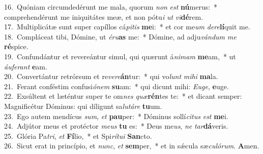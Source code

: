 {16.~}Quóniam circumdedérunt me mala, quorum \textit{non} \textit{est} \textbf{nú}merus:~* comprehendérunt me iniquitátes meæ, et non pótu\textit{i} \textit{ut} \textit{vi}\textbf{dé}rem.\\
{17.~}Multiplicátæ sunt super capíllos cá\textit{pi}\textit{tis} \textbf{me}i:~* et cor me\textit{um} \textit{de}\textit{re}\textbf{lí}quit me.\\
{18.~}Compláceat tibi, Dómine, ut \textit{é}\textit{ru}\textbf{as} me:~* Dómine, ad adju\textit{ván}\textit{dum} \textit{me} \textbf{ré}spice.\\
{19.~}Confundántur et revereántur simul, qui quærunt á\textit{ni}\textit{mam} \textbf{me}am,~* ut \textit{áu}\textit{fe}\textit{rant} \textbf{e}am.\\
{20.~}Convertántur retrórsum et re\textit{ve}\textit{re}\textbf{án}tur:~* qui vo\textit{lunt} \textit{mi}\textit{hi} \textbf{ma}la.\\
{21.~}Ferant conféstim confusi\textit{ó}\textit{nem} \textbf{su}am:~* qui dicunt mihi: \textit{E}\textit{u}\textit{ge}, \textbf{e}uge.\\
{22.~}Exsúltent et læténtur super te om\textit{nes} \textit{quæ}\textbf{rén}tes te:~* et dicant semper: Magnificétur Dóminus: qui díligunt sa\textit{lu}\textit{tá}\textit{re} \textbf{tu}um.\\
{23.~}Ego autem mendícus \textit{sum}, \textit{et} \textbf{pau}per:~* Dóminus sollí\textit{ci}\textit{tus} \textit{est} \textbf{me}i.\\
{24.~}Adjútor meus et protéctor \textit{me}\textit{us} \textbf{tu} es:~* Deus me\textit{us}, \textit{ne} \textit{tar}\textbf{dá}veris.\\
{25.~}Glória Pa\textit{tri}, \textit{et} \textbf{Fí}lio,~* et Spi\textit{rí}\textit{tu}\textit{i} \textbf{San}cto.\\
{26.~}Sicut erat in princípio, et \textit{nunc}, \textit{et} \textbf{sem}per,~* et in sǽcula sæ\textit{cu}\textit{ló}\textit{rum}. \textbf{A}men.\\

